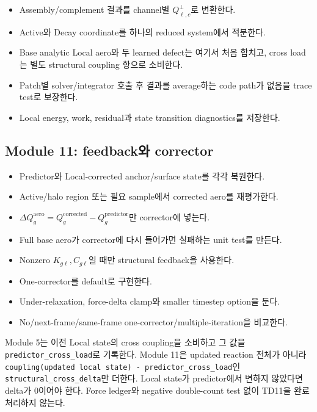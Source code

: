 \documentclass[10pt,a4paper]{article}
\newcommand{\todo}{\textcolor{TodoGray}{\(\square\)}}
\newcommand{\code}[1]{\texttt{#1}}
\begin{document}
\begin{itemize}
  \item[\todo] Assembly/complement 결과를 channel별 \(Q_{\ell,c}^{\perp}\)로 변환한다.
  \item[\todo] Active와 Decay coordinate를 하나의 reduced system에서 적분한다.
  \item[\todo] Base analytic Local aero와 두 learned defect는 여기서 처음 합치고, cross load는 별도 structural coupling 항으로 소비한다.
  \item[\todo] Patch별 solver/integrator 호출 후 결과를 average하는 code path가 없음을 trace test로 보장한다.
  \item[\todo] Local energy, work, residual과 state transition diagnostics를 저장한다.
\end{itemize}

\subsection*{Module 11: feedback와 corrector}

\begin{itemize}
  \item[\todo] Predictor와 Local-corrected anchor/surface state를 각각 복원한다.
  \item[\todo] Active/halo region 또는 필요 sample에서 corrected aero를 재평가한다.
  \item[\todo] \(\Delta Q_g^{\mathrm{aero}}=Q_g^{\mathrm{corrected}}-Q_g^{\mathrm{predictor}}\)만 corrector에 넣는다.
  \item[\todo] Full base aero가 corrector에 다시 들어가면 실패하는 unit test를 만든다.
  \item[\todo] Nonzero \(K_{g\ell},C_{g\ell}\)일 때만 structural feedback을 사용한다.
  \item[\todo] One-corrector를 default로 구현한다.
  \item[\todo] Under-relaxation, force-delta clamp와 smaller timestep option을 둔다.
  \item[\todo] No/next-frame/same-frame one-corrector/multiple-iteration을 비교한다.
\end{itemize}

\begin{tcolorbox}[colback=LightRed,colframe=BlockRed,title=Structural feedback 소비 계약,fonttitle=\bfseries]
Module 5는 이전 Local state의 cross coupling을 소비하고 그 값을 \code{predictor\_cross\_load}로 기록한다.
Module 11은 updated reaction 전체가 아니라
\code{coupling(updated local state) - predictor\_cross\_load}인
\code{structural\_cross\_delta}만 더한다.
Local state가 predictor에서 변하지 않았다면 delta가 0이어야 한다.
Force ledger와 negative double-count test 없이 TD11을 완료 처리하지 않는다.
\end{tcolorbox}
\end{document}
